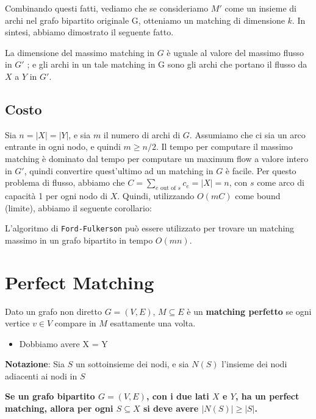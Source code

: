 Combinando questi fatti, vediamo che se consideriamo $M'$ come un
insieme di archi nel grafo bipartito originale G, otteniamo un matching
di dimensione $k$. In sintesi, abbiamo dimostrato il seguente fatto.

\begin{myblockquote}
	La dimensione del massimo matching in $G$ è uguale al valore del
	massimo flusso in $G'$ ; e gli archi in un tale matching in G sono gli
	archi che portano il flusso da $X$ a $Y$ in $G'$.
\end{myblockquote}

\subsection{Costo}

Sia $n = |X| = |Y|$, e sia $m$ il numero di archi di $G$.
Assumiamo che ci sia un arco entrante in ogni nodo, e quindi
$m \ge n/2$. Il tempo per computare il massimo matching è dominato dal
tempo per computare un maximum flow a valore intero in $G'$, quindi
convertire quest'ultimo ad un matching in $G$ è facile. Per questo
problema di flusso, abbiamo che
$C = \sum_{e \text{ out of } s}c_e = |X| = n$, con $s$ come arco di
capacità 1 per ogni nodo di $X$. Quindi, utilizzando $O(mC)$ come
bound (limite), abbiamo il seguente corollario:
\begin{myblockquote}
	L'algoritmo di \texttt{Ford-Fulkerson} può essere utilizzato per trovare
	un matching massimo in un grafo bipartito in tempo $O(mn)$.
\end{myblockquote}


\section{Perfect Matching}

Dato un grafo non diretto $G=(V,E)$, $M \subseteq E$ è un
\textbf{matching perfetto} se ogni vertice $v \in V$ compare in $M$
esattamente una volta.
\begin{itemize}
	\item Dobbiamo avere \textbar X\textbar{} = \textbar Y\textbar{}
\end{itemize}

\textbf{Notazione}: Sia $S$ un sottoinsieme dei nodi, e sia $N(S)$
l'insieme dei nodi adiacenti ai nodi in $S$

\begin{myblockquote}
	\textbf{Se un grafo bipartito $G = (V, E)$, con i due lati $X$ e
		$Y$, ha un perfect matching, allora per ogni $S \subseteq X$ si deve
		avere $|N(S)| \ge |S|$.}
\end{myblockquote}


